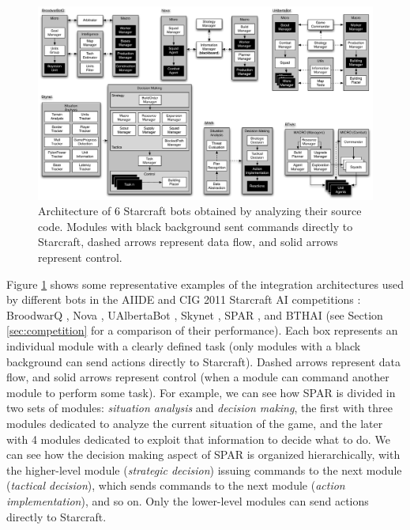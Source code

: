 \documentclass[journal]{IEEEtran}
\begin{document}
\begin{figure}[ta]
    \centering
    \includegraphics[width=\textwidth]{figures/figure-bot-architectures-wide.pdf}
    \caption{Architecture of 6 Starcraft bots obtained by analyzing their source code. Modules with black background sent commands directly to Starcraft, dashed arrows represent data flow, and solid arrows represent control.}
    \label{fig:bot-architecture}
\end{figure}

Figure \ref{fig:bot-architecture} shows some representative examples of the integration architectures used by different bots in the AIIDE and CIG 2011 Starcraft AI competitions \cite{url1,url2}: BroodwarQ \cite{???}, Nova \cite{???}, UAlbertaBot \cite{???}, Skynet \cite{???}, SPAR \cite{???}, and BTHAI \cite{???} (see Section \ref{sec:competition} for a comparison of their performance). Each box represents an individual module with a clearly defined task (only modules with a black background can send actions directly to Starcraft). Dashed arrows represent data flow, and solid arrows represent control (when a module can command another module to perform some task). For example, we can see how SPAR is divided in two sets of modules: {\em situation analysis} and {\em decision making}, the first with three modules dedicated to analyze the current situation of the game, and the later with 4 modules dedicated to exploit that information to decide what to do. We can see how the decision making aspect of SPAR is organized hierarchically, with the higher-level module ({\em strategic decision}) issuing commands to the next module ({\em tactical decision}), which sends commands to the next module ({\em action implementation}), and so on. Only the lower-level modules can send actions directly to Starcraft. 
\end{document}
